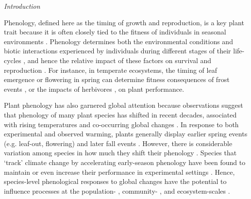 \documentclass[11pt]{article}
\begin{document}
\emph{Introduction} 

Phenology, defined here as the timing of growth and reproduction, is a key plant trait because it is often closely tied to the fitness of individuals in seasonal environments \citep{verdu2005early,munguia2011meta}. Phenology determines both the environmental conditions and biotic interactions experienced by individuals during different stages of their life-cycles \citep{donohue2005niche}, and hence the relative impact of these factors on survival and reproduction \citep{caruso2019meta}. For instance, in temperate ecosystems, the timing of leaf emergence or flowering in spring can determine fitness consequences of frost events \citep{inouye2008effects,augspurger2013reconstructing}, or the impacts of herbivores \citep{meineke2021phenological}, on plant performance.

Plant phenology has also garnered global attention because observations suggest that phenology of many plant species has shifted in recent decades, associated with rising temperatures and co-occurring global changes \citep{wolkovich2012warming,parmesan2015plants,menzel2020climate}. In response to both experimental and observed warming, plants generally display earlier spring events (e.g. leaf-out, flowering) and later fall events \citep[e.g. senescence][]{Henry:1997lg,menzel2020climate}. However, there is considerable variation among species in how much they shift their phenology \citep[][sometimes termed `phenological sensitivity,']{cook2012divergent,wolkovich2012warming,konig2018advances}. Species that `track' climate change by accelerating early-season phenology have been found to maintain or even increase their performance in experimental settings \citep{cleland2012phenological,wolkovich2021phenological}. Hence, species-level phenological responses to global changes have the potential to influence processes at the population- \citep{iler2021demographic}, community- \citep{cook2012divergent,caradonna2014shifts}, and ecosystem-scales \citep{piao2019plant}.
\end{document}
